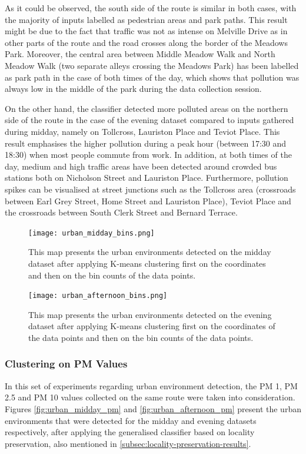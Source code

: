 \documentclass[bsc,frontabs,twoside,singlespacing, parskip,deptreport]{infthesis}     %
\begin{document}
As it could be observed, the south side of the route is similar in both cases, with the majority of inputs labelled as pedestrian areas and park paths. This result might be due to the fact that traffic was not as intense on Melville Drive as in other parts of the route and the road crosses along the border of the Meadows Park. Moreover, the central area between Middle Meadow Walk and North Meadow Walk (two separate alleys crossing the Meadows Park) has been labelled as park path in the case of both times of the day, which shows that pollution was always low in the middle of the park during the data collection session.

On the other hand, the classifier detected more polluted areas on the northern side of the route in the case of the evening dataset compared to inputs gathered during midday, namely on Tollcross, Lauriston Place and Teviot Place. This result emphasises the higher pollution during a peak hour (between 17:30 and 18:30) when most people commute from work. In addition, at both times of the day, medium and high traffic areas have been detected around crowded bus stations both on Nicholson Street and Lauriston Place. Furthermore, pollution spikes can be visualised at street junctions such as the Tollcross area (crossroads between Earl Grey Street, Home Street and Lauriston Place), Teviot Place and the crossroads between South Clerk Street and Bernard Terrace.


\begin{figure}[h!]
  \center
  \texttt{[image: urban\_midday\_bins.png]}
  \caption{This map presents the urban environments detected on the midday dataset after applying K-means clustering first on the coordinates and then on the bin counts of the data points.}
  \label{fig:urban_midday_bins}
\end{figure}

\begin{figure}[h!]
  \center
  \texttt{[image: urban\_afternoon\_bins.png]}
  \caption{This map presents the urban environments detected on the evening dataset after applying K-means clustering first on the coordinates of the data points and then on the bin counts of the data points.}
  \label{fig:urban_afternoon_bins}
\end{figure}

\subsubsection*{Clustering on PM Values}

In this set of experiments regarding urban environment detection, the PM 1, PM 2.5 and PM 10 values collected on the same route were taken into consideration. Figures \ref{fig:urban_midday_pm} and \ref{fig:urban_afternoon_pm} present the urban environments that were detected for the midday and evening datasets respectively, after applying the generalised classifier based on locality preservation, also mentioned in \ref{subsec:locality-preservation-results}.
\end{document}
